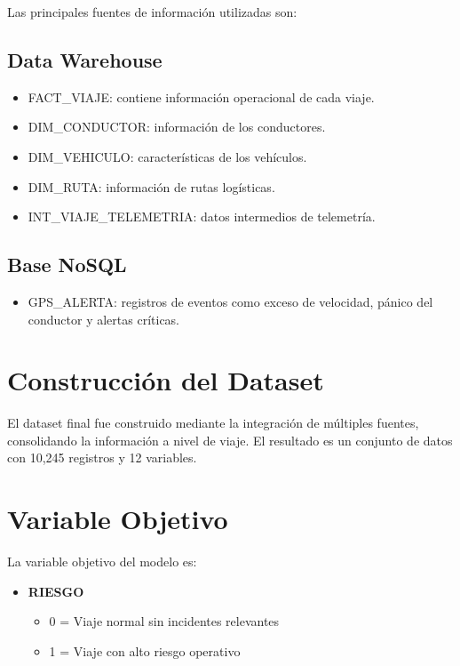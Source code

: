 \documentclass[12pt]{article}
\begin{document}
Las principales fuentes de información utilizadas son:

\subsection{Data Warehouse}

\begin{itemize}
    \item FACT\_VIAJE: contiene información operacional de cada viaje.
    \item DIM\_CONDUCTOR: información de los conductores.
    \item DIM\_VEHICULO: características de los vehículos.
    \item DIM\_RUTA: información de rutas logísticas.
    \item INT\_VIAJE\_TELEMETRIA: datos intermedios de telemetría.
\end{itemize}

\subsection{Base NoSQL}

\begin{itemize}
    \item GPS\_ALERTA: registros de eventos como exceso de velocidad, pánico del conductor y alertas críticas.
\end{itemize}

\section{Construcción del Dataset}

El dataset final fue construido mediante la integración de múltiples fuentes, consolidando la información a nivel de viaje. El resultado es un conjunto de datos con 10,245 registros y 12 variables.

\section{Variable Objetivo}

La variable objetivo del modelo es:

\begin{itemize}
    \item \textbf{RIESGO}
    \begin{itemize}
        \item 0 = Viaje normal sin incidentes relevantes
        \item 1 = Viaje con alto riesgo operativo
    \end{itemize}
\end{itemize}
\end{document}
